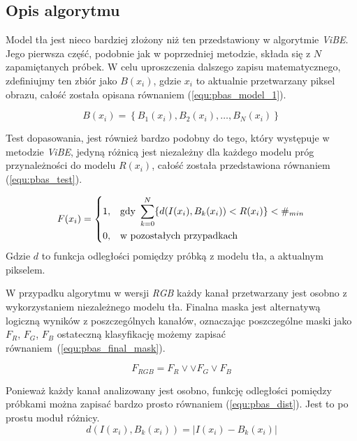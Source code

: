 \subsection{Opis algorytmu}
\label{subsec:pbas_opis}

Model tła jest nieco bardziej złożony niż ten przedstawiony w algorytmie \textit{ViBE}. Jego pierwsza część, podobnie jak w poprzedniej metodzie, składa się z $N$ zapamiętanych próbek. W celu uproszczenia dalszego zapisu matematycznego, zdefiniujmy ten zbiór jako $B(x_i)$, gdzie $x_i$ to aktualnie przetwarzany piksel obrazu, całość została opisana równaniem (\ref{equ:pbas_model_1}).

	\begin{equation}
		B(x_i)= \left\{ B_1(x_i), B_2(x_i), \dotsc, B_N(x_i) \right\}
	\label{equ:pbas_model_1}	
	\end{equation}

Test dopasowania, jest również bardzo podobny do tego, który występuje w metodzie \textit{ViBE}, jedyną różnicą jest niezależny dla każdego modelu próg przynależności do modelu $R(x_i)$, całość została przedstawiona równaniem (\ref{equ:pbas_test}).

	\begin{equation}
	    F(x_i) = 
		\begin{dcases}
    		1, & \text{gdy } \sum_{k=0}^{N} \{ d(I(x_i), B_k(x_i)) < R(x_i) \} < \#_{min} \\
    		0, & \text{w pozostałych przypadkach} 
		\end{dcases}
	\label{equ:pbas_test}	
	\end{equation}
\noindent Gdzie $d$ to funkcja odległości pomiędzy próbką z modelu tła, a aktualnym pikselem. 

W przypadku algorytmu w wersji \textit{RGB} każdy kanał przetwarzany jest osobno z wykorzystaniem niezależnego modelu tła. Finalna maska jest alternatywą logiczną wyników z poszczególnych kanałów, oznaczając poszczególne maski jako $F_R$, $F_G$, $F_B$ ostateczną klasyfikację możemy zapisać równaniem~(\ref{equ:pbas_final_mask}).

    \begin{equation}
        F_{RGB} = F_R \lor \lor F_G \lor F_B
    \label{equ:pbas_final_mask}
    \end{equation}


Ponieważ każdy kanał analizowany jest osobno, funkcję odległości pomiędzy próbkami można zapisać bardzo prosto równaniem (\ref{equ:pbas_dist}). Jest to po prostu moduł różnicy.
	\begin{equation}
		d(I(x_i),B_k(x_i)) = | I(x_i) - B_k(x_i) |
	\label{equ:pbas_dist}	
	\end{equation}

